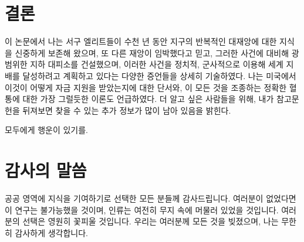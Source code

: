 \documentclass[10pt,twocolumn,letterpaper]{article}
\begin{document}
\section{결론}

이 논문에서 나는 서구 엘리트들이 수천 년 동안 지구의 반복적인 대재앙에 대한 지식을 신중하게 보존해 왔으며, 또 다른 재앙이 임박했다고 믿고, 그러한 사건에 대비해 광범위한 지하 대피소를 건설했으며, 이러한 사건을 정치적, 군사적으로 이용해 세계 지배를 달성하려고 계획하고 있다는 다양한 증언들을 상세히 기술하였다. 나는 미국에서 이것이 어떻게 자금 지원을 받았는지에 대한 단서와, 이 모든 것을 조종하는 정확한 혈통에 대한 가장 그럴듯한 이론도 언급하였다. 더 알고 싶은 사람들을 위해, 내가 참고문헌을 뒤져보면 찾을 수 있는 추가 정보가 많이 남아 있음을 밝힌다.

모두에게 행운이 있기를.

\section{감사의 말씀}

공공 영역에 지식을 기여하기로 선택한 모든 분들께 감사드립니다. 여러분이 없었다면 이 연구는 불가능했을 것이며, 인류는 여전히 무지 속에 머물러 있었을 것입니다. 여러분의 선택은 영원히 꽃피울 것입니다. 우리는 여러분께 모든 것을 빚졌으며, 나는 무한히 감사하게 생각합니다.

\clearpage
\twocolumn

{\small


}
\end{document}
